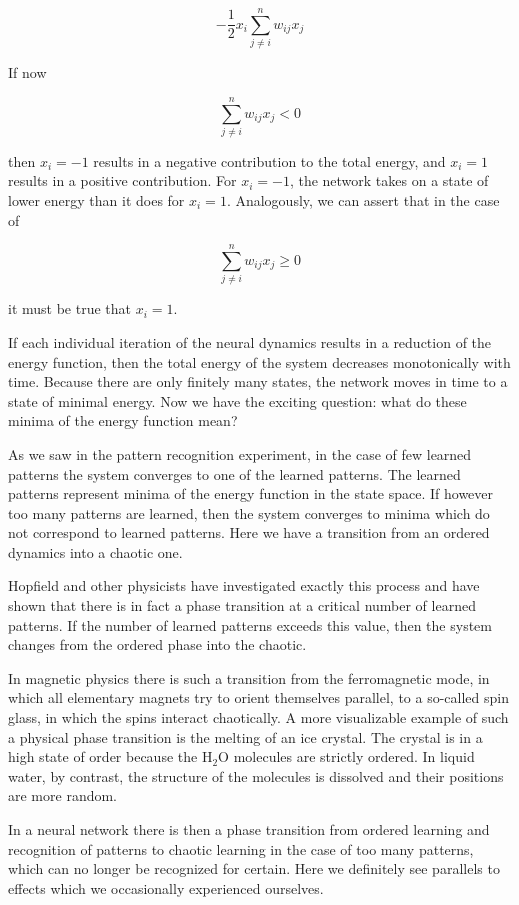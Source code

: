 \documentclass[10pt]{book}
\begin{document}
$$
-\frac{1}{2} x_{i} \sum_{j \neq i}^{n} w_{i j} x_{j}
$$

If now

$$
\sum_{j \neq i}^{n} w_{i j} x_{j}<0
$$

then $x_{i}=-1$ results in a negative contribution to the total energy, and $x_{i}=1$ results in a positive contribution. For $x_{i}=-1$, the network takes on a state of lower energy than it does for $x_{i}=1$. Analogously, we can assert that in the case of

$$
\sum_{j \neq i}^{n} w_{i j} x_{j} \geq 0
$$

it must be true that $x_{i}=1$.

If each individual iteration of the neural dynamics results in a reduction of the energy function, then the total energy of the system decreases monotonically with time. Because there are only finitely many states, the network moves in time to a state of minimal energy. Now we have the exciting question: what do these minima of the energy function mean?

As we saw in the pattern recognition experiment, in the case of few learned patterns the system converges to one of the learned patterns. The learned patterns represent minima of the energy function in the state space. If however too many patterns are learned, then the system converges to minima which do not correspond to learned patterns. Here we have a transition from an ordered dynamics into a chaotic one.

Hopfield and other physicists have investigated exactly this process and have shown that there is in fact a phase transition at a critical number of learned patterns. If the number of learned patterns exceeds this value, then the system changes from the ordered phase into the chaotic.

In magnetic physics there is such a transition from the ferromagnetic mode, in which all elementary magnets try to orient themselves parallel, to a so-called spin glass, in which the spins interact chaotically. A more visualizable example of such a physical phase transition is the melting of an ice crystal. The crystal is in a high state of order because the $\mathrm{H}_{2} \mathrm{O}$ molecules are strictly ordered. In liquid water, by contrast, the structure of the molecules is dissolved and their positions are more random.

In a neural network there is then a phase transition from ordered learning and recognition of patterns to chaotic learning in the case of too many patterns, which can no longer be recognized for certain. Here we definitely see parallels to effects which we occasionally experienced ourselves.
\end{document}
